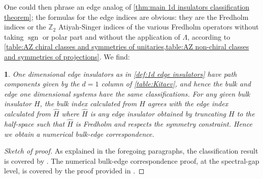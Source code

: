 \documentclass[a4paper,10pt]{article}
\numberwithin{equation}{section}
\theoremstyle{plain}
\newtheorem{thm}{\protect\theoremname}[section]
\theoremstyle{plain}
\theoremstyle{plain}
\theoremstyle{plain}
\theoremstyle{plain}
\theoremstyle{remark}
\theoremstyle{definition}
\theoremstyle{plain}
\providecommand{\theoremname}{Theorem}
\newcommand{\ZZ}{\mathbb{Z}}
\newcommand{\bbLambda}{\mathbb{\Lambda}}
\newcommand{\sgn}{\operatorname{sgn}}
\begin{document}
	One could then phrase an edge analog of \cref{thm:main 1d insulators classification theorem}; the formulas for the edge indices are obvious: they are the Fredholm indices or the $\ZZ_2$ Atiyah-Singer indices of the various Fredholm operators without taking $\sgn$ or polar part and without the application of $\bbLambda$, according to \cref{table:AZ chiral classes and symmetries of unitaries,table:AZ non-chiral classes and symmetries of projections}. We find:
	\begin{thm} One dimensional edge insulators as in \cref{def:1d edge insulators} have path components given by the $d=1$ column of \cref{table:Kitaev}, and hence the bulk and edge one dimensional systems have the same classifications. For any given bulk insulator $H$, the bulk index calculated from $H$ agrees with the edge index calculated from $\widehat{H}$ where $\widehat{H}$ is any edge insulator obtained by truncating $H$ 
		to the half-space such that $\widehat{H}$ is Fredholm and respects the symmetry constraint. Hence we obtain a numerical bulk-edge correspondence.
	\end{thm}
	\begin{proof}[Sketch of proof]
		As explained in the foregoing paragraphs, the classification result is covered by \cite{AtiyahSinger1969}. The numerical bulk-edge correspondence proof, at the spectral-gap level, is covered by the proof provided in \cite[Section 3]{Graf_Shapiro_2018_1D_Chiral_BEC}.
	\end{proof}
	
	
\end{document}
